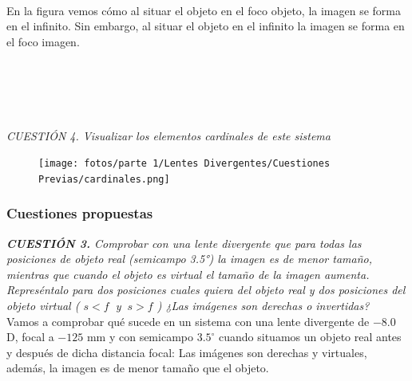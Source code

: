 \documentclass[11pt]{article}
\begin{document}
        \hspace{0mm}\\\hspace{0mm}\\\hspace{0mm}\\En la figura vemos cómo al situar el objeto en el foco objeto, la imagen se forma en el infinito. Sin embargo, al situar el objeto en el infinito la imagen se forma en el foco imagen.\\\hspace{0mm}\\\hspace{0mm}\\\hspace{0mm}\\\hspace{0mm}\\\hspace{0mm}\\
        
        \textit{CUESTIÓN 4.  Visualizar los elementos cardinales de este sistema}\\

        \begin{figure}[ht]
            \centering
            \texttt{[image: fotos/parte 1/Lentes Divergentes/Cuestiones Previas/cardinales.png]}
        \end{figure}
        
        \clearpage
        \subsubsection{Cuestiones propuestas}
        \textit{\textbf{CUESTIÓN 3.} Comprobar con una lente divergente que para todas las posiciones de objeto real (semicampo 3.5°) la imagen es de menor tamaño, mientras que cuando el objeto es virtual el tamaño de la imagen aumenta. Represéntalo para dos posiciones cuales quiera del objeto real y dos posiciones del objeto virtual ( $s<f\ $ y $\ s>f$ ) ¿Las imágenes son derechas o invertidas?}\\
        
        Vamos a comprobar qué sucede en un sistema con una lente divergente de $-8.0$ D, focal a $-125$ mm y con semicampo $3.5^\circ$ cuando situamos un objeto real antes y después de dicha distancia focal: Las imágenes son derechas y virtuales, además, la imagen es de menor tamaño que el objeto.
\end{document}
